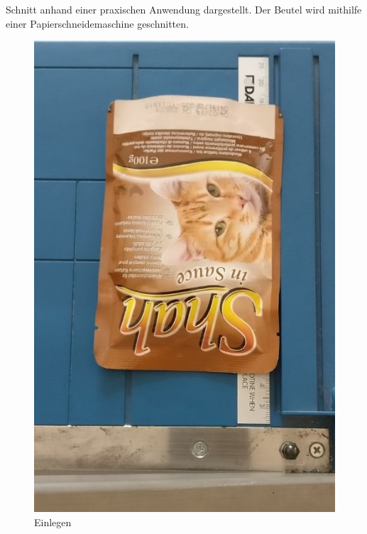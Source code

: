 \documentclass[a4paper,12pt]{scrartcl}
\begin{document}
Schnitt anhand einer praxischen Anwendung dargestellt. Der Beutel wird mithilfe einer Papierschneidemaschine geschnitten.

\begin{figure}[H]
   \begin{minipage}[hbt]{.3\linewidth} %
      \includegraphics[width=\linewidth]{Bilder/Schneideversuch_1.Art/Einlegen}
      \caption{Einlegen}
   \end{minipage}
   \hspace{.2\linewidth}%
   \begin{minipage}[hbt]{.5\linewidth} %

\end{minipage}
\end{figure}
\end{document}
